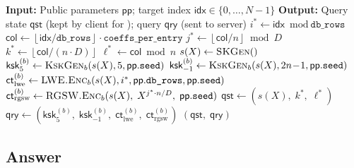 \documentclass[11pt,a4paper]{article}
\newcommand{\floor}[1]{\left\lfloor #1 \right\rfloor}
\begin{document}
\begin{algorithm}[H]
\caption{$\textsc{Query}(\mathsf{pp},\; \mathsf{idx})$}
\label{alg:query}
\begin{algorithmic}[1]
\State \textbf{Input:} Public parameters $\mathsf{pp}$; target index $\mathsf{idx} \in \{0, \ldots, N-1\}$
\State \textbf{Output:} Query state $\mathsf{qst}$ (kept by client for ); query $\mathsf{qry}$ (sent to server)
\Statex
\State {}
\State $i^* \gets \mathsf{idx} \bmod \texttt{db\_rows}$ 
\State $\mathsf{col} \gets \floor{\mathsf{idx} / \texttt{db\_rows}} \cdot \texttt{coeffs\_per\_entry}$ 
\State $j^* \gets \floor{\mathsf{col} / n} \bmod D$ 
\State $k^* \gets \floor{\mathsf{col} / (n \cdot D)}$ 
\State $\ell^* \gets \mathsf{col} \bmod n$ 
\Statex
\State {}
\State $s(X) \gets \textsc{SKGen}()$ 
\State $\mathsf{ksk}_5^{(b)} \gets \textsc{KskGen}_b(s(X), 5, \mathsf{pp}.\texttt{seed})$ 
\State $\mathsf{ksk}_{-1}^{(b)} \gets \textsc{KskGen}_b(s(X), 2n\!-\!1, \mathsf{pp}.\texttt{seed})$ 
\Statex
\State {}
\State $\mathsf{ct}_{\mathrm{lwe}}^{(b)} \gets \textsc{LWE.Enc}_b(s(X), i^*, \mathsf{pp}.\texttt{db\_rows}, \mathsf{pp}.\texttt{seed})$ 
\State $\mathsf{ct}_{\mathrm{rgsw}}^{(b)} \gets \textsc{RGSW.Enc}_b(s(X),\; X^{j^* \cdot n/D},\; \mathsf{pp}.\texttt{seed})$ 
\Statex
\State $\mathsf{qst} \gets (s(X),\; k^*,\; \ell^*)$
\State $\mathsf{qry} \gets (\mathsf{ksk}_5^{(b)},\; \mathsf{ksk}_{-1}^{(b)},\; \mathsf{ct}_{\mathrm{lwe}}^{(b)},\; \mathsf{ct}_{\mathrm{rgsw}}^{(b)})$
\State \Return $(\mathsf{qst},\; \mathsf{qry})$
\end{algorithmic}
\end{algorithm}

\subsection{Answer}\label{sec:answer}
\end{document}
